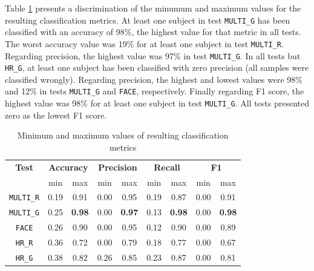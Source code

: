 Table \ref{table:study5-result-metrics-minmax} presents a discrimination of the minumum and maximum values for the resulting classification metrics. At least one subject in test \texttt{MULTI\_G} has been classified with an accuracy of 98\%, the highest value for that metric in all tests. The worst accuracy value was 19\% for at least one subject in test \texttt{MULTI\_R}. Regarding precision, the highest value was 97\% in test \texttt{MULTI\_G}. In all tests but \texttt{HR\_G}, at least one subject has been classified with zero precision (all samples were classified wrongly). Regarding precision, the highest and lowest values were 98\% and 12\% in tests \texttt{MULTI\_G} and \texttt{FACE}, respectively. Finally regarding F1 score, the highest value was 98\% for at least one subject in test \texttt{MULTI\_G}. All tests presented zero as the lowest F1 score.

\begin{table}[!htbp]
  \centering
  \caption{Minimum and maximum values of resulting classification metrics}
  \label{table:study5-result-metrics-minmax}
  \begin{tabular}{ccccccccc}
    \hline
      \textbf{Test} & \multicolumn{2}{c}{\textbf{Accuracy}} & \multicolumn{2}{c}{\textbf{Precision}} & \multicolumn{2}{c}{\textbf{Recall}} & \multicolumn{2}{c}{\textbf{F1}} \\
      {} & min & max & min & max & min & max & min & max \\
    \hline
      \texttt{MULTI\_R}  & 0.19 & 0.91 & 0.00 & 0.95 & 0.19 & 0.87 & 0.00 & 0.91 \\ %
      \texttt{MULTI\_G}  & 0.25 & \textbf{0.98} & 0.00 & \textbf{0.97} & 0.13 & \textbf{0.98} & 0.00 & \textbf{0.98} \\ %
      \texttt{FACE}  & 0.26 & 0.90 & 0.00 & 0.95 & 0.12 & 0.90 & 0.00 & 0.89 \\ %
      \texttt{HR\_R}  & 0.36 & 0.72 & 0.00 & 0.79 & 0.18 & 0.77 & 0.00 & 0.67 \\ %
      \texttt{HR\_G}  & 0.38 & 0.82 & 0.26 & 0.85 & 0.23 & 0.87 & 0.00 & 0.81 \\ %
    \hline
  \end{tabular}
\end{table}


